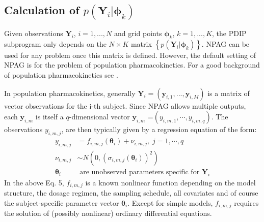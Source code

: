 \subsection{Calculation of $p(\bm{Y}_i\vert \bm{\phi}_k)$}
%
Given observations $\bm{Y}_i$, $i =  1,...,N$ and grid points  $\bm{\phi}_k$, $k =  1,...,K$,  the PDIP subprogram only depends on the $N \times K$ matrix 
$\left\{ p(\bm{Y}_i\vert \bm{\phi}_k)\right\}$. NPAG can be used for any problem  once this matrix is defined.   However, the default setting of NPAG is for the problem of population pharmacokinetics. For   a good background of population pharmacokinetics see \citet{DandG1995,DandG2003}.
%

In population pharmacokinetics, generally  $\bm{Y}_i=( \bm{y}_{i,1}, ... , \bm{y}_{i,M})$ is a matrix of vector observations for the i-th subject. 
%
Since NPAG allows multiple outputs, each $\bm{y}_{i,m}$ is itself a $q$-dimensional vector
$\bm{y}_{i,m}$ =$(y_{i,m,1}, \cdots,y_{i,m,q} )$. %
%
The observations $y_{i,m,j}$, %
are then typically given by a regression equation of the form:
\begin{align}
	y_{i,m,j} &= f_{i,m,j}(\bm{\theta}_i) + \nu_{i,m,j} \label{Eqn:f},\; j=1,\cdots,q \\
	 \nu_{i,m,j} &\sim  N(0,(\sigma_{i,m,j}(\bm{\theta}_i))^2) \nonumber \\
	 \bm{\theta}_i & \mbox{ are unobserved parameters specific for $\bm{Y}_i$} \nonumber
\nonumber
\end{align}
In the above Eq. 5, $f_{i,m,j}$ %
is a known nonlinear function depending on the model structure, the dosage regimen, the sampling schedule, all covariates and of course the subject-specific parameter vector $\bm{\theta}_i$. 
Except for simple models, $f_{i,m,j}$
requires the solution of (possibly nonlinear) ordinary differential equations.


